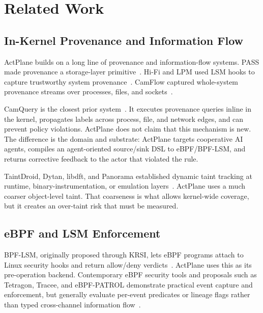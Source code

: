 \section{Related Work}

\subsection{In-Kernel Provenance and Information Flow}

ActPlane builds on a long line of provenance and information-flow systems.
PASS made provenance a storage-layer primitive~\cite{muniswamy2006pass}.
Hi-Fi and LPM used LSM hooks to capture trustworthy system
provenance~\cite{pohly2012hifi,bates2015lpm}. CamFlow captured whole-system
provenance streams over processes, files, and sockets~\cite{pasquier2017camflow}.

CamQuery is the closest prior system~\cite{pasquier2018camquery}. It executes
provenance queries inline in the kernel, propagates labels across process, file,
and network edges, and can prevent policy violations. ActPlane does not claim
that this mechanism is new. The difference is the domain and substrate:
ActPlane targets cooperative AI agents, compiles an agent-oriented source/sink
DSL to eBPF/BPF-LSM, and returns corrective feedback to the actor that violated
the rule.

TaintDroid, Dytan, libdft, and Panorama established dynamic taint tracking at
runtime, binary-instrumentation, or emulation layers~\cite{enck2010taintdroid,
clause2007dytan,kemerlis2012libdft,yin2007panorama}. ActPlane uses a much
coarser object-level taint. That coarseness is what allows kernel-wide coverage,
but it creates an over-taint risk that must be measured.

\subsection{eBPF and LSM Enforcement}

BPF-LSM, originally proposed through KRSI, lets eBPF programs attach to Linux
security hooks and return allow/deny verdicts~\cite{singh2019krsi,linuxbpflsm}.
ActPlane uses this as its pre-operation backend. Contemporary eBPF security
tools and proposals such as Tetragon, Tracee, and eBPF-PATROL demonstrate
practical event capture and enforcement, but generally evaluate per-event
predicates or lineage flags rather than typed cross-channel information
flow~\cite{ciliumtetragon,aquasecuritytracee,ghimire2025ebpfpatrol}.

